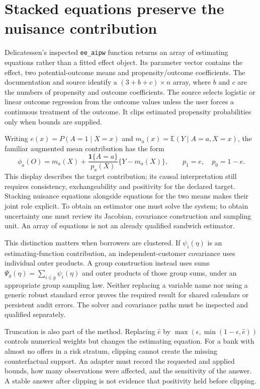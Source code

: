\section{Stacked equations preserve the nuisance contribution}

Delicatessen's inspected \texttt{ee\_aipw} function returns an array of estimating
equations rather than a fitted effect object. Its parameter vector contains the
effect, two potential-outcome means and propensity/outcome coefficients. The
documentation and source identify a $(3+b+c)\times n$ array, where $b$ and $c$
are the numbers of propensity and outcome coefficients. The source selects
logistic or linear outcome regression from the outcome values unless the user
forces a continuous treatment of the outcome. It clips estimated propensity
probabilities only when bounds are supplied.\cite{v13_sw_delicatessen}

Writing $e(x)=P(A=1\mid X=x)$ and $m_a(x)=\mathbb E(Y\mid A=a,X=x)$, the
familiar augmented mean contribution has the form
\[
 \phi_a(O)=m_a(X)+\frac{\mathbf 1\{A=a\}}{p_a(X)}
                   \{Y-m_a(X)\},
 \qquad p_1=e,\quad p_0=1-e.
\]
This display describes the target contribution; its causal interpretation still
requires consistency, exchangeability and positivity for the declared target.
Stacking nuisance equations alongside equations for the two means makes their
joint role explicit. To obtain an estimator one must solve the system; to obtain
uncertainty one must review its Jacobian, covariance construction and sampling
unit. An array of equations is not an already qualified sandwich estimator.

This distinction matters when borrowers are clustered. If $\psi_i(\eta)$ is
an estimating-function contribution, an independent-customer covariance uses
individual outer products. A group construction instead uses sums
$\Psi_g(\eta)=\sum_{i\in g}\psi_i(\eta)$ and outer products of those group
sums, under an appropriate group sampling law. Neither replacing a variable
name nor using a generic robust standard error proves the required result for
shared calendars or persistent audit errors. The solver and covariance paths
must be inspected and qualified separately.

Truncation is also part of the method. Replacing $\widehat e$ by
$\max(\epsilon,\min(1-\epsilon,\widehat e))$ controls numerical weights but
changes the estimating equation. For a bank with almost no offers in a risk
stratum, clipping cannot create the missing counterfactual support. An adapter
must record the requested and applied bounds, how many observations were
affected, and the sensitivity of the answer. A stable answer after clipping is
not evidence that positivity held before clipping.

